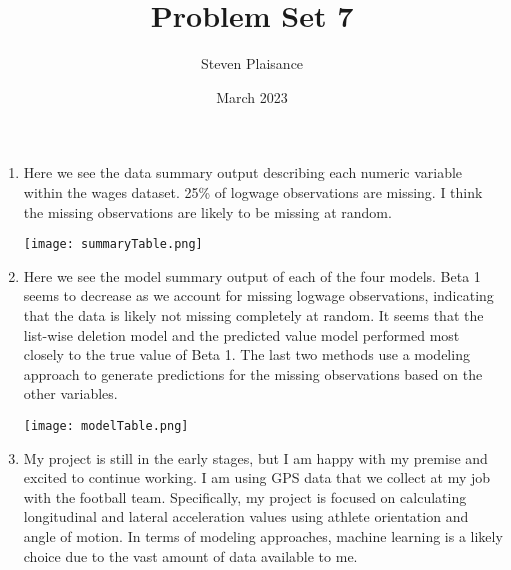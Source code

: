 \documentclass{article}
\title{Problem Set 7}
\author{Steven Plaisance}
\date{March 2023}
\begin{document}
\maketitle

\begin{enumerate}
  \item Here we see the data summary output describing each numeric variable within the wages dataset. 25\% of logwage observations are missing. I think the missing observations are likely to be missing at random. 
  
  \linebreak
  \linebreak
      \parbox{\linewidth}{
        \texttt{[image: summaryTable.png]}
        \centering
        \\}
  \item Here we see the model summary output of each of the four models. Beta 1 seems to decrease as we account for missing logwage observations, indicating that the data is likely not missing completely at random. It seems that the list-wise deletion model and the predicted value model performed most closely to the true value of Beta 1. The last two methods use a modeling approach to generate predictions for the missing observations based on the other variables. 
  
    \linebreak
    \linebreak
      \parbox{\linewidth}{
        \texttt{[image: modelTable.png]}
        \centering
        \\}
        
  \item My project is still in the early stages, but I am happy with my premise and excited to continue working. I am using GPS data that we collect at my job with the football team. Specifically, my project is focused on calculating longitudinal and lateral acceleration values using athlete orientation and angle of motion. In terms of modeling approaches, machine learning is a likely choice due to the vast amount of data available to me. 
\end{enumerate}
\end{document}
